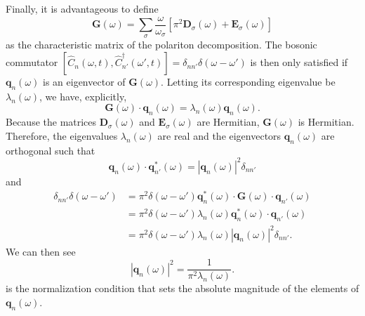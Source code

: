 Finally, it is advantageous to define
\begin{equation}
\mathbf{G}(\omega) = \sum_\sigma\frac{\omega}{\omega_\sigma}\left[\pi^2\mathbf{D}_\sigma(\omega) + \mathbf{E}_\sigma(\omega)\right]
\end{equation}
as the characteristic matrix of the polariton decomposition. The bosonic commutator $[\hat{C}_n(\omega,t),\hat{C}_{n'}^\dagger(\omega',t)] = \delta_{nn'}\delta(\omega - \omega')$ is then only satisfied if $\mathbf{q}_n(\omega)$ is an eigenvector of $\mathbf{G}(\omega)$. Letting its corresponding eigenvalue be $\lambda_n(\omega)$, we have, explicitly,
\begin{equation}
\mathbf{G}(\omega)\cdot\mathbf{q}_n(\omega) = \lambda_n(\omega)\mathbf{q}_n(\omega).
\end{equation}
Because the matrices $\mathbf{D}_\sigma(\omega)$ and $\mathbf{E}_\sigma(\omega)$ are Hermitian, $\mathbf{G}(\omega)$ is Hermitian.  Therefore, the eigenvalues $\lambda_n(\omega)$ are real and the eigenvectors $\mathbf{q}_n(\omega)$ are orthogonal such that
\begin{equation}
\mathbf{q}_n(\omega)\cdot\mathbf{q}_{n'}^*(\omega) = |\mathbf{q}_n(\omega)|^2\delta_{nn'}
\end{equation}
and
\begin{equation}
\begin{split}
\delta_{nn'}\delta(\omega - \omega') &= \pi^2\delta(\omega - \omega')\mathbf{q}_n^*(\omega)\cdot\mathbf{G}(\omega)\cdot\mathbf{q}_{n'}(\omega)\\
&= \pi^2\delta(\omega - \omega')\lambda_n(\omega)\mathbf{q}_n^*(\omega)\cdot\mathbf{q}_{n'}(\omega)\\
&= \pi^2\delta(\omega - \omega')\lambda_n(\omega)|\mathbf{q}_n(\omega)|^2\delta_{nn'}.
\end{split}
\end{equation}
We can then see
\begin{equation}
|\mathbf{q}_n(\omega)|^2 = \frac{1}{\pi^2\lambda_n(\omega)}.
\end{equation}
is the normalization condition that sets the absolute magnitude of the elements of $\mathbf{q}_n(\omega)$. 

